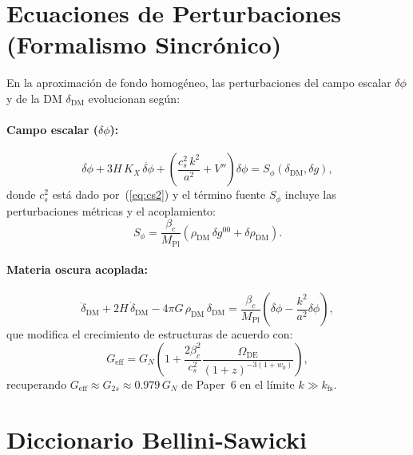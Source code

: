 \documentclass[11pt,a4paper]{article}
\newcommand{\Mpl}{M_{\mathrm{Pl}}}
\newcommand{\Omde}{\Omega_{\mathrm{DE}}}
\newcommand{\brac}[1]{\left(#1\right)}
\begin{document}
\section{Ecuaciones de Perturbaciones (Formalismo Sincrónico)}
\label{sec:perturbaciones}

En la aproximación de fondo homogéneo, las perturbaciones del campo escalar
$\delta\phi$ y de la DM $\delta_{\mathrm{DM}}$ evolucionan según:

\paragraph{Campo escalar ($\delta\phi$):}
\begin{equation}
  \ddot{\delta\phi}
  + 3H\,K_X\,\dot{\delta\phi}
  + \brac{\frac{c_s^2\,k^2}{a^2} + V''}\delta\phi
  = S_\phi(\delta_{\mathrm{DM}}, \delta g),
  \label{eq:pert_phi}
\end{equation}
donde $c_s^2$ está dado por~(\ref{eq:cs2}) y el término fuente $S_\phi$
incluye las perturbaciones métricas y el acoplamiento:
\begin{equation}
  S_\phi = \frac{\beta_c}{\Mpl}\brac{\rho_{\mathrm{DM}}\,\delta g^{00}
           + \delta\rho_{\mathrm{DM}}}.
\end{equation}

\paragraph{Materia oscura acoplada:}
\begin{equation}
  \ddot\delta_{\mathrm{DM}} + 2H\,\dot\delta_{\mathrm{DM}}
  - 4\pi G\,\rho_{\mathrm{DM}}\,\delta_{\mathrm{DM}}
  = \frac{\beta_c}{\Mpl}\brac{\ddot{\delta\phi}
    - \frac{k^2}{a^2}\delta\phi},
  \label{eq:pert_DM}
\end{equation}
que modifica el crecimiento de estructuras de acuerdo con:
\begin{equation}
  G_{\mathrm{eff}} = G_N\brac{1 + \frac{2\beta_c^2}{c_s^2}
    \frac{\Omde}{(1+z)^{-3(1+w_0)}}},
  \label{eq:Geff}
\end{equation}
recuperando $G_{\mathrm{eff}} \approx G_{2s} \approx 0.979\,G_N$ de
Paper~6 en el límite $k \gg k_{\mathrm{fs}}$.

\section{Diccionario Bellini-Sawicki}
\label{sec:bellini}
\end{document}
